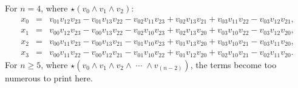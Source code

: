 \documentclass[12pt]{article}
\begin{document}
For $n = 4$, where $\star(v_{0} \wedge v_{1} \wedge v_{2})$:
\begin{eqnarray}
x_{0} &=& 
   v_{01} v_{12} v_{23}
 - v_{01} v_{13} v_{22}
 - v_{02} v_{11} v_{23}
 + v_{02} v_{13} v_{21}
 + v_{03} v_{11} v_{22}
 - v_{03} v_{12} v_{21},\\
x_{1} &=& 
    v_{00} v_{12} v_{23}
  - v_{00} v_{13} v_{22}
 - v_{02} v_{10} v_{23}
 + v_{02} v_{13} v_{20}
  + v_{03} v_{10} v_{22}
  - v_{03} v_{12} v_{20},\\
x_{2} &=& 
v_{00} v_{11} v_{23}
- v_{00} v_{13} v_{21}
  - v_{01} v_{10} v_{23}
  + v_{01} v_{13} v_{20}
  + v_{03} v_{10} v_{21}
  - v_{03} v_{11} v_{20},\\
x_{3} &=& 
   v_{00} v_{11} v_{22}
 - v_{00} v_{12} v_{21}
 - v_{01} v_{10} v_{22}
 + v_{01} v_{12} v_{20}
 + v_{02} v_{10} v_{21}
 - v_{02} v_{11} v_{20}.
\end{eqnarray}
For $n \ge 5$, where $\star(v_{0} \wedge v_{1} \wedge v_{2} \wedge\;\cdots\;\wedge v_{(n - 2)})$, the terms become too numerous to print here.


















\end{document}
